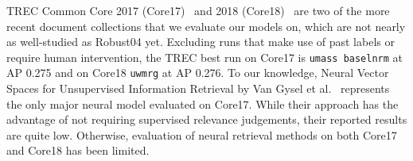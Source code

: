 
TREC Common Core 2017 (Core17)~\cite{allan2017trec} and 2018 (Core18)~\cite{core2018trec} are two of the more recent document collections that we evaluate our models on, which are not nearly as well-studied as Robust04 yet.
Excluding runs that make use of past labels or require human intervention, the TREC best run on Core17 is \texttt{umass baselnrm} at AP 0.275 and on Core18 \texttt{uwmrg} at AP 0.276.
To our knowledge, Neural Vector Spaces for Unsupervised Information Retrieval by Van Gysel et al.~\cite{Gysel:2018:NVS:3211967.3196826} represents the only major neural model evaluated on Core17.
While their approach has the advantage of not requiring supervised relevance judgements, their reported results are quite low.
Otherwise, evaluation of neural retrieval methods on both Core17 and Core18 has been limited.